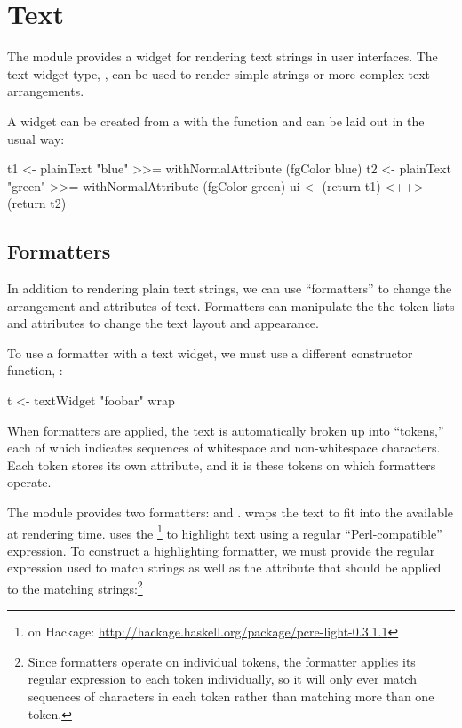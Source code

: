 \section{Text}

The  module provides a widget for rendering text strings in
user interfaces.  The text widget type, , can
be used to render simple strings or more complex text arrangements.

A  widget can be created from a  with the
 function and can be laid out in the usual way:

\begin{haskellcode}
 t1 <- plainText "blue" >>= withNormalAttribute (fgColor blue)
 t2 <- plainText "green" >>= withNormalAttribute (fgColor green)
 ui <- (return t1) <++> (return t2)
\end{haskellcode}

\subsection{Formatters}

In addition to rendering plain text strings, we can use ``formatters''
to change the arrangement and attributes of text.  Formatters can
manipulate the the token lists and attributes to change the text
layout and appearance.

To use a formatter with a text widget, we must use a different
constructor function, :

\begin{haskellcode}
 t <- textWidget "foobar" wrap
\end{haskellcode}

When formatters are applied, the text is automatically broken up into
``tokens,'' each of which indicates sequences of whitespace and
non-whitespace characters.  Each token stores its own attribute, and
it is these tokens on which formatters operate.

The  module provides two formatters:  and
.   wraps the text to fit into the
 available at rendering time.   uses
the \footnote{ on Hackage:
  \href{http://hackage.haskell.org/package/pcre-light-0.3.1.1}{http://hackage.haskell.org/package/pcre-light-0.3.1.1}}
to highlight text using a regular ``Perl-compatible'' expression.  To
construct a highlighting formatter, we must provide the regular
expression used to match strings as well as the attribute that should
be applied to the matching strings:\footnote{Since formatters operate
  on individual tokens, the  formatter applies its
  regular expression to each token individually, so it will only ever
  match sequences of characters in each token rather than matching
  more than one token.}

